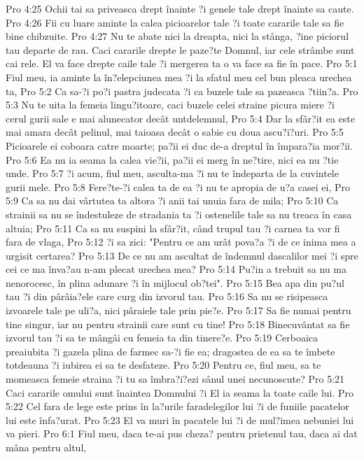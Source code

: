 Pro 4:25  Ochii tai sa priveasca drept înainte ?i genele tale drept înainte sa caute.
Pro 4:26  Fii cu luare aminte la calea picioarelor tale ?i toate cararile tale sa fie bine chibzuite.
Pro 4:27  Nu te abate nici la dreapta, nici la stânga, ?ine piciorul tau departe de rau. Caci cararile drepte le paze?te Domnul, iar cele strâmbe sunt cai rele. El va face drepte caile tale ?i mergerea ta o va face sa fie în pace.
Pro 5:1  Fiul meu, ia aminte la în?elepciunea mea ?i la sfatul meu cel bun pleaca urechea ta,
Pro 5:2  Ca sa-?i po?i pastra judecata ?i ca buzele tale sa pazeasca ?tiin?a.
Pro 5:3  Nu te uita la femeia lingu?itoare, caci buzele celei straine picura miere ?i cerul gurii sale e mai alunecator decât untdelemnul,
Pro 5:4  Dar la sfâr?it ea este mai amara decât pelinul, mai taioasa decât o sabie cu doua ascu?i?uri.
Pro 5:5  Picioarele ei coboara catre moarte; pa?ii ei duc de-a dreptul în împara?ia mor?ii.
Pro 5:6  Ea nu ia seama la calea vie?ii, pa?ii ei merg în ne?tire, nici ea nu ?tie unde.
Pro 5:7  ?i acum, fiul meu, asculta-ma ?i nu te îndeparta de la cuvintele gurii mele.
Pro 5:8  Fere?te-?i calea ta de ea ?i nu te apropia de u?a casei ei,
Pro 5:9  Ca sa nu dai vârtutea ta altora ?i anii tai unuia fara de mila;
Pro 5:10  Ca strainii sa nu se îndestuleze de stradania ta ?i ostenelile tale sa nu treaca în casa altuia;
Pro 5:11  Ca sa nu suspini la sfâr?it, când trupul tau ?i carnea ta vor fi fara de vlaga,
Pro 5:12  ?i sa zici: "Pentru ce am urât pova?a ?i de ce inima mea a urgisit certarea?
Pro 5:13  De ce nu am ascultat de îndemnul dascalilor mei ?i spre cei ce ma înva?au n-am plecat urechea mea?
Pro 5:14  Pu?in a trebuit sa nu ma nenorocesc, în plina adunare ?i în mijlocul ob?tei".
Pro 5:15  Bea apa din pu?ul tau ?i din pârâia?ele care curg din izvorul tau.
Pro 5:16  Sa nu se risipeasca izvoarele tale pe uli?a, nici pâraiele tale prin pie?e.
Pro 5:17  Sa fie numai pentru tine singur, iar nu pentru strainii care sunt cu tine!
Pro 5:18  Binecuvântat sa fie izvorul tau ?i sa te mângâi cu femeia ta din tinere?e.
Pro 5:19  Cerboaica preaiubita ?i gazela plina de farmec sa-?i fie ea; dragostea de ea sa te îmbete totdeauna ?i iubirea ei sa te desfateze.
Pro 5:20  Pentru ce, fiul meu, sa te momeasca femeie straina ?i tu sa îmbra?i?ezi sânul unei necunoscute?
Pro 5:21  Caci cararile omului sunt înaintea Domnului ?i El ia seama la toate caile lui.
Pro 5:22  Cel fara de lege este prins în la?urile faradelegilor lui ?i de funiile pacatelor lui este înfa?urat.
Pro 5:23  El va muri în pacatele lui ?i de mul?imea nebuniei lui va pieri.
Pro 6:1  Fiul meu, daca te-ai pus cheza? pentru prietenul tau, daca ai dat mâna pentru altul,
